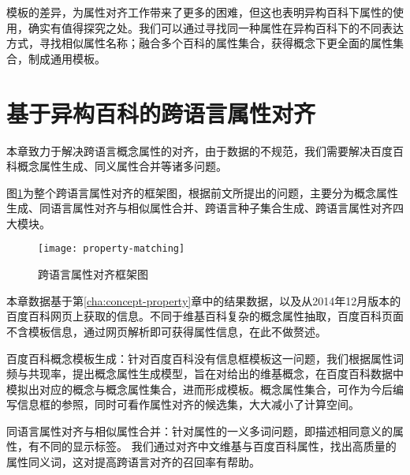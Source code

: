 模板的差异，为属性对齐工作带来了更多的困难，但这也表明异构百科下属性的使用，确实有值得探究之处。我们可以通过寻找同一种属性在异构百科下的不同表达方式，寻找相似属性名称；融合多个百科的属性集合，获得概念下更全面的属性集合，制成通用模板。

\section{基于异构百科的跨语言属性对齐}
\label{sec:property-matching}

本章致力于解决跨语言概念属性的对齐，由于数据的不规范，我们需要解决百度百科概念属性生成、同义属性合并等诸多问题。


图\ref{fig:property-matching}为整个跨语言属性对齐的框架图，根据前文所提出的问题，主要分为概念属性生成、同语言属性对齐与相似属性合并、跨语言种子集合生成、跨语言属性对齐四大模块。

\begin{figure}[H]
  \centering
  \texttt{[image: property-matching]}
  \caption{跨语言属性对齐框架图}
  \label{fig:property-matching}
\end{figure}

本章数据基于第\ref{cha:concept-property}章中的结果数据，以及从2014年12月版本的百度百科网页上获取的信息。不同于维基百科复杂的概念属性抽取，百度百科页面不含模板信息，通过网页解析即可获得属性信息，在此不做赘述。

{\heiti 百度百科概念模板生成：}针对百度百科没有信息框模板这一问题，我们根据属性词频与共现率，提出概念属性生成模型，旨在对给出的维基概念，在百度百科数据中模拟出对应的概念与概念属性集合，进而形成模板。概念属性集合，可作为今后编写信息框的参照，同时可看作属性对齐的候选集，大大减小了计算空间。

{\heiti 同语言属性对齐与相似属性合并：}针对属性的一义多词问题，即描述相同意义的属性，有不同的显示标签。
我们通过对齐中文维基与百度百科属性，找出高质量的属性同义词，这对提高跨语言对齐的召回率有帮助。

